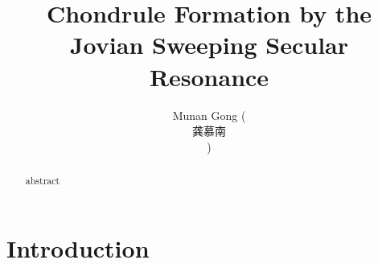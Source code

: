 \documentclass[iop,numberedappendix]{emulateapj}
\begin{document}
\title{Chondrule Formation by the Jovian Sweeping Secular Resonance}
\author{Munan Gong (\begin{CJK*}{UTF8}{gbsn}龚慕南\end{CJK*})}

\begin{abstract}
    abstract
\end{abstract}

\section{Introduction}



\end{document}
